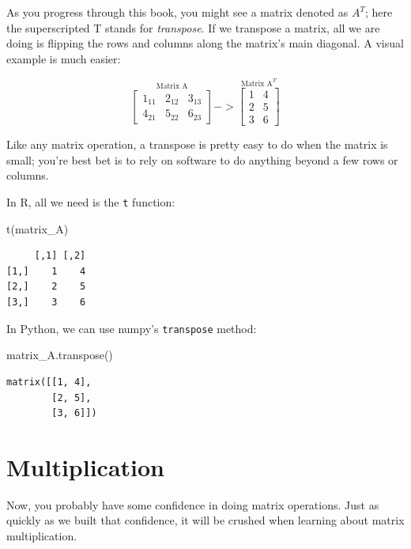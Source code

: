 \documentclass[
  letterpaper,
]{krantz}
\newenvironment{Shaded}{}{}
\newcommand{\FunctionTok}[1]{\textcolor[rgb]{0.02,0.16,0.49}{#1}}
\newcommand{\NormalTok}[1]{#1}
\begin{document}
As you progress through this book, you might see a matrix denoted as
\(A^T\); here the superscripted T stands for \emph{transpose}. If we
transpose a matrix, all we are doing is flipping the rows and columns
along the matrix's main diagonal. A visual example is much easier:

\[
\stackrel{\mbox{Matrix A}}{
\begin{bmatrix}
1_{11} & 2_{12} & 3_{13}\\
4_{21} & 5_{22} & 6_{23}
\end{bmatrix}
}
->
\stackrel{\mbox{Matrix A}^T}{
\begin{bmatrix}
1 & 4 \\
2 & 5 \\
3 & 6
\end{bmatrix}
}
\]

Like any matrix operation, a transpose is pretty easy to do when the
matrix is small; you're best bet is to rely on software to do anything
beyond a few rows or columns.

In R, all we need is the \texttt{t} function:

\begin{Shaded}
\begin{Highlighting}[]
\FunctionTok{t}\NormalTok{(matrix\_A)}
\end{Highlighting}
\end{Shaded}

\begin{verbatim}
     [,1] [,2]
[1,]    1    4
[2,]    2    5
[3,]    3    6
\end{verbatim}

In Python, we can use numpy's \texttt{transpose} method:

\begin{Shaded}
\begin{Highlighting}[]
\NormalTok{matrix\_A.transpose()}
\end{Highlighting}
\end{Shaded}

\begin{verbatim}
matrix([[1, 4],
        [2, 5],
        [3, 6]])
\end{verbatim}

\section{Multiplication}\label{multiplication}

Now, you probably have some confidence in doing matrix operations. Just
as quickly as we built that confidence, it will be crushed when learning
about matrix multiplication.
\end{document}
